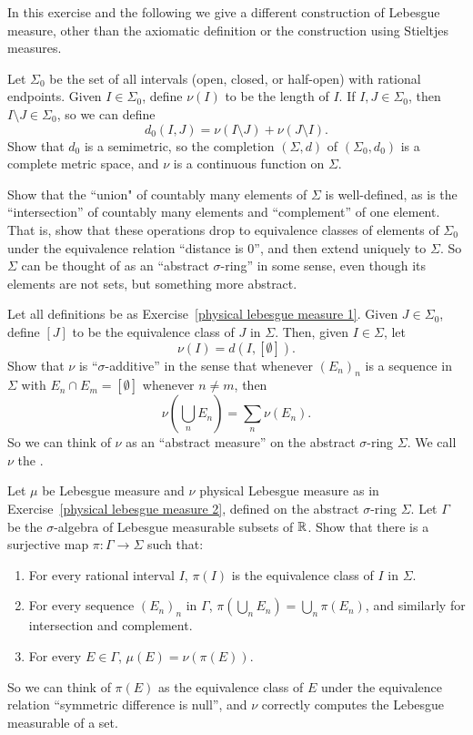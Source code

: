 \begin{exercise}\label{physical lebesgue measure 1}
In this exercise and the following we give a different construction of Lebesgue measure, other than the axiomatic definition or the construction using Stieltjes measures.

Let $\Sigma_0$ be the set of all intervals (open, closed, or half-open) with rational endpoints.
Given $I \in \Sigma_0$, define $\nu(I)$ to be the length of $I$.
If $I, J \in \Sigma_0$, then $I \setminus J \in \Sigma_0$, so we can define
\[d_0(I, J) = \nu(I \setminus J) + \nu(J \setminus I).\]
Show that $d_0$ is a semimetric, so the completion $(\Sigma, d)$ of $(\Sigma_0, d_0)$ is a complete metric space, and $\nu$ is a continuous function on $\Sigma$.

Show that the ``union" of countably many elements of $\Sigma$ is well-defined, as is the ``intersection'' of countably many elements and ``complement'' of one element.
That is, show that these operations drop to equivalence classes of elements of $\Sigma_0$ under the equivalence relation ``distance is $0$'', and then extend uniquely to $\Sigma$.
So $\Sigma$ can be thought of as an ``abstract $\sigma$-ring'' in some sense, even though its elements are not sets, but something more abstract.
\end{exercise}

\begin{exercise}\label{physical lebesgue measure 2}
Let all definitions be as Exercise~\ref{physical lebesgue measure 1}.
Given $J \in \Sigma_0$, define $[J]$ to be the equivalence class of $J$ in $\Sigma$.
Then, given $I \in \Sigma$, let
\[\nu(I) = d(I, [\emptyset]).\]
Show that $\nu$ is ``$\sigma$-additive'' in the sense that whenever ${(E_{n})}_{n}$ is a sequence in $\Sigma$ with $E_{n} \cap E_{m} = [\emptyset]$ whenever $n \neq m$, then
\[\nu\left(\bigcup_{n} E_{n}\right) = \sum_{n} \nu(E_{n}).\]
So we can think of $\nu$ as an ``abstract measure'' on the abstract $\sigma$-ring $\Sigma$.
We call $\nu$ the .
\end{exercise}

\begin{exercise}\label{physical lebesgue measure 3}
Let $\mu$ be Lebesgue measure and $\nu$ physical Lebesgue measure as in Exercise~\ref{physical lebesgue measure 2}, defined on the abstract $\sigma$-ring $\Sigma$.
Let $\Gamma$ be the $\sigma$-algebra of Lebesgue measurable subsets of $\mathbb{R}$. Show that there is a surjective map $\pi: \Gamma \to \Sigma$ such that:
\begin{enumerate}
\item For every rational interval $I$, $\pi(I)$ is the equivalence class of $I$ in $\Sigma$.
\item For every sequence ${(E_{n})}_{n}$ in $\Gamma$, $\pi(\bigcup_{n} E_{n}) = \bigcup_{n} \pi(E_{n})$, and similarly for intersection and complement.
\item For every $E \in \Gamma$, $\mu(E) = \nu(\pi(E))$.
\end{enumerate}
So we can think of $\pi(E)$ as the equivalence class of $E$ under the equivalence relation ``symmetric difference is null'', and $\nu$ correctly computes the Lebesgue measurable of a set.
\end{exercise}
